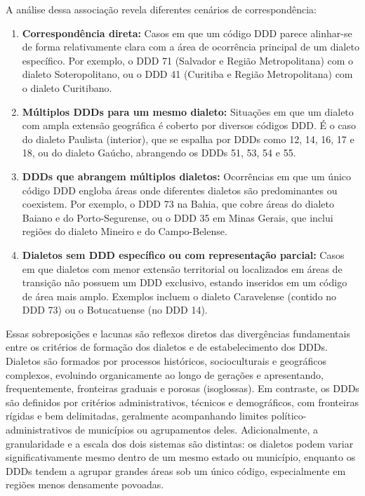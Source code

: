 A análise dessa associação revela diferentes cenários de correspondência:
\begin{enumerate}
    \item \textbf{Correspondência direta:} Casos em que um código DDD parece alinhar-se de forma relativamente clara com a área de ocorrência principal de um dialeto específico. Por exemplo, o DDD 71 (Salvador e Região Metropolitana) com o dialeto Soteropolitano, ou o DDD 41 (Curitiba e Região Metropolitana) com o dialeto Curitibano.
    \item \textbf{Múltiplos DDDs para um mesmo dialeto:} Situações em que um dialeto com ampla extensão geográfica é coberto por diversos códigos DDD. É o caso do dialeto Paulista (interior), que se espalha por DDDs como 12, 14, 16, 17 e 18, ou do dialeto Gaúcho, abrangendo os DDDs 51, 53, 54 e 55.
    \item \textbf{DDDs que abrangem múltiplos dialetos:} Ocorrências em que um único código DDD engloba áreas onde diferentes dialetos são predominantes ou coexistem. Por exemplo, o DDD 73 na Bahia, que cobre áreas do dialeto Baiano e do Porto-Segurense, ou o DDD 35 em Minas Gerais, que inclui regiões do dialeto Mineiro e do Campo-Belense.
    \item \textbf{Dialetos sem DDD específico ou com representação parcial:} Casos em que dialetos com menor extensão territorial ou localizados em áreas de transição não possuem um DDD exclusivo, estando inseridos em um código de área mais amplo. Exemplos incluem o dialeto Caravelense (contido no DDD 73) ou o Botucatuense (no DDD 14).
\end{enumerate}

Essas sobreposições e lacunas são reflexos diretos das divergências fundamentais entre os critérios de formação dos dialetos e de estabelecimento dos DDDs. Dialetos são formados por processos históricos, socioculturais e geográficos complexos, evoluindo organicamente ao longo de gerações e apresentando, frequentemente, fronteiras graduais e porosas (isoglossas). Em contraste, os DDDs são definidos por critérios administrativos, técnicos e demográficos, com fronteiras rígidas e bem delimitadas, geralmente acompanhando limites político-administrativos de municípios ou agrupamentos deles. Adicionalmente, a granularidade e a escala dos dois sistemas são distintas: os dialetos podem variar significativamente mesmo dentro de um mesmo estado ou município, enquanto os DDDs tendem a agrupar grandes áreas sob um único código, especialmente em regiões menos densamente povoadas.



